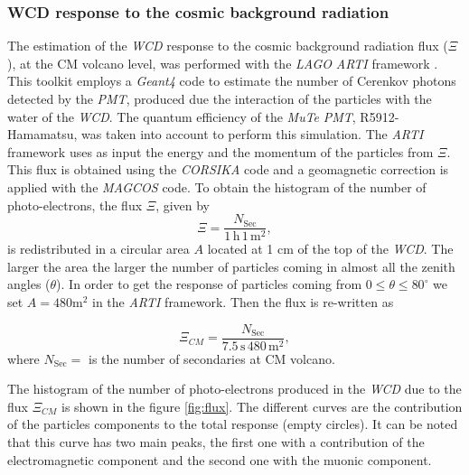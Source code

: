 \documentclass[submitting]{nst}
\begin{document}
\subsubsection{WCD response to the cosmic background radiation}%
The estimation of the \textsl{WCD} response to the cosmic background radiation flux ($\Xi$), at the CM volcano level, was performed with the \textsl{LAGO} \textsl{ARTI} framework \cite{SarmientoEtal2019}. This toolkit employs a \textsl{Geant4} code to estimate the number of Cerenkov photons detected by the \textsl{PMT}, produced due the interaction of the particles with the water of the \textsl{WCD}. The quantum efficiency of the \textsl{MuTe} \textsl{PMT}, R5912-Hamamatsu, was taken into account to perform this simulation. The \textsl{ARTI} framework uses as input the energy and the momentum of the particles from $\Xi$. This flux is obtained using the \textsl{CORSIKA} code and a geomagnetic correction is applied with the \textsl{MAGCOS} code. To obtain the histogram of the number of photo-electrons, the flux $\Xi$, given by
\begin{equation}
\Xi = \frac{N_{\mathrm{Sec}}}{1\,\mathrm{h}\, 1\,\mathrm{m}^2}, 
\end{equation}
is redistributed in a circular area $A$ located at 1 cm of the top of the \textsl{WCD}. The larger the area the larger the number of particles coming in almost all the zenith angles ($\theta$). In order to get the response of particles coming from $0\leq \theta \leq 80^{\circ}$ we set $A=480$m$^2$ in the \textsl{ARTI} framework. Then the flux is re-written as

\begin{equation}
\Xi_{CM} = \frac{N_{\mathrm{Sec}}}{7.5\,\mathrm{s}\, 480\,\mathrm{m}^2}, 
\end{equation}
where $N_{\mathrm{Sec}}=$ is the number of secondaries at CM volcano.

The histogram of the number of photo-electrons produced in the \textsl{WCD} due to the flux $\Xi_{CM}$ is shown in the figure \ref{fig:flux}. The different curves are the contribution of the particles components to the total response (empty circles). It can be noted that this curve has two main peaks, the first one with a contribution of the electromagnetic component and the second one with the muonic component.
\end{document}
